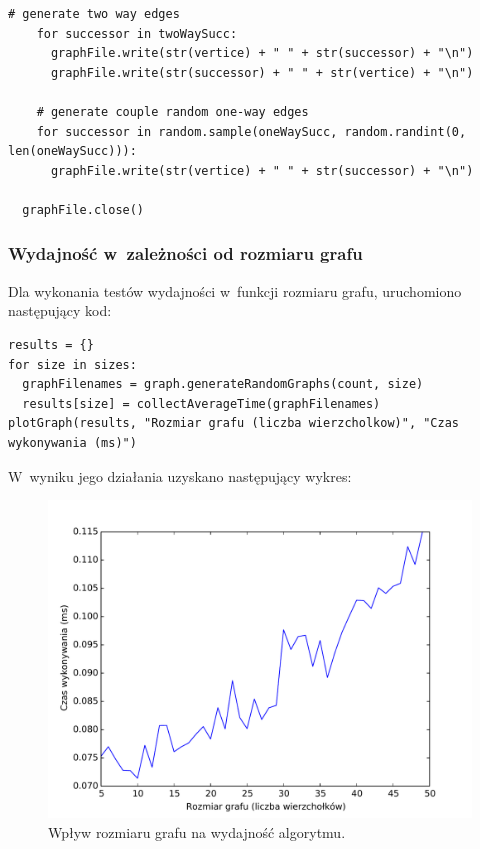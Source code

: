 \documentclass[11pt,a4paper]{article}
\begin{document}
\begin{lstlisting}[caption = Funkcje generujące grafy dla testów wydajnościowych]
    # generate two way edges
    for successor in twoWaySucc:
      graphFile.write(str(vertice) + " " + str(successor) + "\n")
      graphFile.write(str(successor) + " " + str(vertice) + "\n")

    # generate couple random one-way edges
    for successor in random.sample(oneWaySucc, random.randint(0, len(oneWaySucc))):
      graphFile.write(str(vertice) + " " + str(successor) + "\n")

  graphFile.close()
\end{lstlisting}

\newpage
\subsubsection{Wydajność w~zależności od rozmiaru grafu}
Dla wykonania testów wydajności w~funkcji rozmiaru grafu, uruchomiono następujący kod:\\

\begin{lstlisting}[caption = Testy wydajności w~zależności od rozmiaru grafu]
results = {}
for size in sizes:
  graphFilenames = graph.generateRandomGraphs(count, size)
  results[size] = collectAverageTime(graphFilenames)
plotGraph(results, "Rozmiar grafu (liczba wierzcholkow)", "Czas wykonywania (ms)")
\end{lstlisting}

W~wyniku jego działania uzyskano następujący wykres:

\begin{figure}[H]
  \includegraphics[trim = 0mm 2mm 0mm 12mm, clip, width=14cm]{img/size.pdf}
  \caption{Wpływ rozmiaru grafu na wydajność algorytmu.}
\end{figure}
\end{document}
